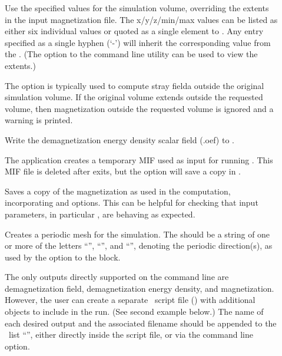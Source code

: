 \begin{description}
\item[]
  Use the specified values for the simulation volume, overriding the
  extents in the input  magnetization file.  The
  x/y/z/min/max values can be listed as either six individual values or
  quoted as a single element to . Any entry specified
  as a single hyphen (`-') will inherit the corresponding value from the
  .  (The  option to the command line utility
   can be used to
  view the  extents.)

  The  option is typically used to compute stray
  fielda outside the original simulation volume. If the original volume
  extends outside the requested volume, then magnetization outside the
  requested volume is ignored and a warning is printed.

\item[]
  Write the demagnetization energy density scalar field (.oef) to
  .
\item[]
  The  application creates a temporary MIF used as
  input for running . This MIF file is deleted after
   exits, but the  option will save a copy in
  .
\item[]
  Saves a copy of the magnetization as used in the computation,
  incorporating  and  options.
  This can be helpful for checking that input parameters, in particular
  , are behaving as expected.
\item[]
  Creates a periodic mesh for the simulation. The 
  should be a string of one or more of the letters ``'',
  ``'', and ``'', denoting the periodic direction(s), as
  used by the  option to the
   block.

\item[]
  The only outputs directly supported on the  command
  line are demagnetization field, demagnetization energy density, and
  magnetization. However, the user can create a separate \Tcl\ script
  file () with additional  objects
  to include in the run. (See second example below.) The name of each
  desired output and the associated filename should be appended to the
  \Tcl\ list ``'', either directly inside the script
  file, or via the  command line option.


\end{description}
